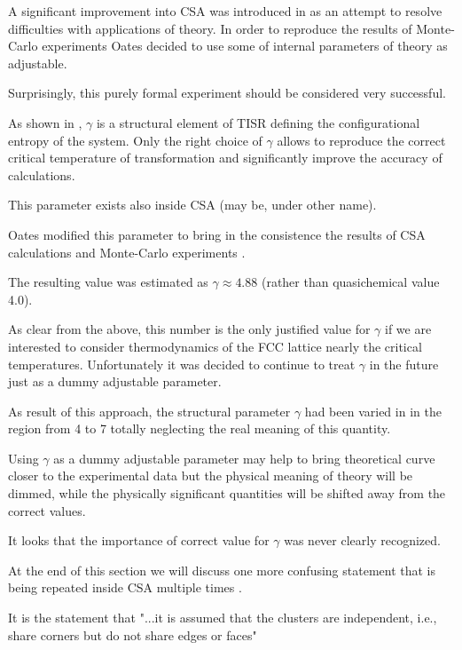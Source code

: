 \documentclass[12pt,abstract]{scrartcl}
\begin{document}
A significant improvement into CSA was introduced in  \cite{Oates1999} as an attempt to resolve difficulties with applications of theory.
In order to reproduce the results of  Monte-Carlo experiments  \cite{Ferreira1998} Oates \cite{Oates1999} decided to use some of internal  parameters of theory as adjustable.

Surprisingly, this purely formal experiment should be considered very successful.

As shown in \cite{TISR_p4}, $\gamma$ is a structural element of TISR defining the configurational entropy of the system.
Only the right choice of $\gamma$ allows to reproduce the correct critical temperature of transformation and significantly improve the accuracy of calculations.

This parameter exists also inside CSA (may be, under other name).

Oates modified this parameter to bring in the consistence the results of  CSA calculations and Monte-Carlo experiments  \cite{Ferreira1998}. 

The resulting value was estimated as $\gamma \approx 4.88$ (rather than quasichemical value 4.0).

As clear from the above, this number is the only justified value for $\gamma$ if we are interested to consider  thermodynamics of the FCC lattice nearly the critical temperatures.
Unfortunately it was decided to continue to treat  $\gamma$  in the future just as a dummy adjustable parameter. 

As result of this approach, the structural parameter $\gamma$ had been varied in \cite{oates1996, Oates1999, oates2007, zhu2010} in the region from 4 to  7 totally neglecting the real meaning of this  quantity.

Using $\gamma$ as  a dummy adjustable parameter  may help to bring theoretical curve closer  to the experimental data  but  the physical meaning of theory will be  dimmed, while the 
 physically significant quantities will be shifted away from the correct values.

It looks that the importance of correct value for $\gamma$ was never clearly recognized.


At the end of this section we will discuss one more confusing statement that is being repeated inside CSA multiple times 
\cite{oates1996, Oates1999, oates2007, zhu2010}.

It is the  statement that "...it is assumed that the clusters are independent, i.e., share corners but do not share edges or faces" 
\end{document}
